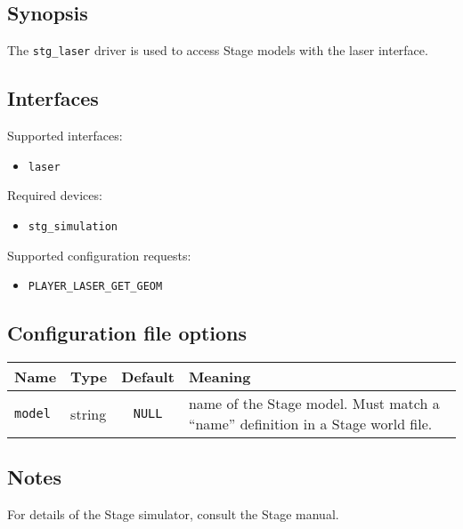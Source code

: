 \subsection*{Synopsis}

The {\tt stg\_laser} driver is used to access Stage models with the
laser interface.

\subsection*{Interfaces}

\noindent Supported interfaces:
\begin{itemize}
\item {\tt laser}
\end{itemize}

\noindent Required devices:
\begin{itemize}
\item {\tt stg\_simulation}
\end{itemize}

\noindent Supported configuration requests:
\begin{itemize}
\item \verb+PLAYER_LASER_GET_GEOM+
\end{itemize}


\subsection*{Configuration file options}

\begin{center}
{\small \begin{tabularx}{\columnwidth}{|l|l|c|X|}
\hline
Name & Type & Default & Meaning\\
\hline
{\tt model} & string & {\tt NULL} & name of the Stage model. Must match a ``name'' definition in a Stage world file. \\
\hline
\end{tabularx}}
\end{center}

\subsection*{Notes}

For details of the Stage simulator, consult the Stage manual.

